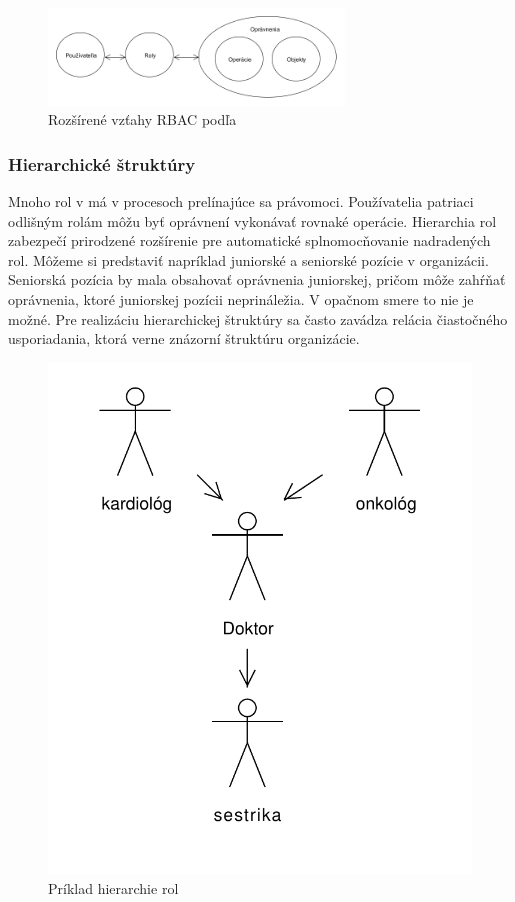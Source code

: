 \begin{figure}[h]
	\centerline{\includegraphics[width=0.7\textwidth]{images/rbac_kuhn_full}}
	\caption{Rozšírené vzťahy RBAC podľa \cite{kuhn}}
	\label{obr:rbac_kuhn_full}
\end{figure}



\subsubsection{Hierarchické štruktúry}
Mnoho rol v má v procesoch prelínajúce sa právomoci. Používatelia patriaci odlišným rolám môžu byť oprávnení vykonávať rovnaké operácie. Hierarchia rol zabezpečí prirodzené rozšírenie pre automatické splnomocňovanie nadradených rol. Môžeme si predstaviť napríklad juniorské a seniorské pozície v organizácii. Seniorská pozícia by mala obsahovať oprávnenia juniorskej, pričom môže zahŕňať oprávnenia, ktoré juniorskej pozícii neprináležia.   V opačnom smere to nie je možné.  Pre realizáciu hierarchickej štruktúry sa často zavádza relácia čiastočného usporiadania, ktorá verne znázorní štruktúru organizácie. 

\begin{figure}[h]
	\centerline{\includegraphics[height=0.45\textwidth]{images/hierarchia_priklad}}
	\caption{Príklad hierarchie rol}
	\label{obr:rbac_hierarchy}
\end{figure}






